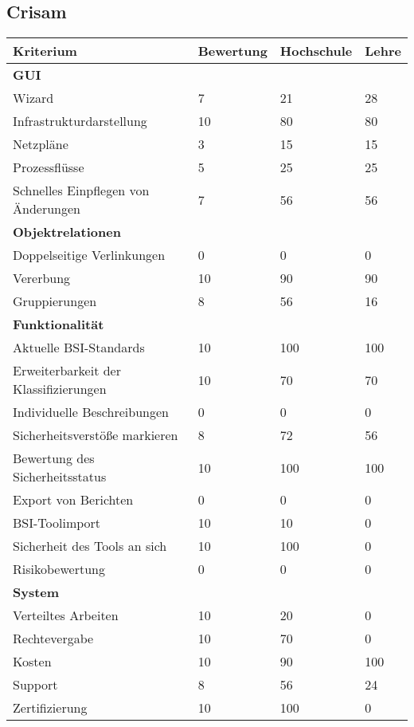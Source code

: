 \documentclass{book}
\begin{document}
\subsection{Crisam}
\begin{table}[h]
\begin{tabular}{|p{}|p{}|p{}|p{}|}
\hline 
Kriterium & Bewertung & Hochschule & Lehre\\ 
\hline 
\textbf{GUI}& & &\\
\hline
Wizard & 7 & 21 & 28\\
\hline 
Infrastrukturdarstellung & 10 & 80 & 80 \\
\hline 
Netzpläne & 3 & 15 & 15\\
\hline 
Prozessflüsse & 5 & 25 & 25\\
\hline 
Schnelles Einpflegen von Änderungen & 7 & 56 & 56\\
\hline
\textbf{Objektrelationen} & & & \\
\hline 
Doppelseitige Verlinkungen & 0 & 0 & 0 \\
\hline 
Vererbung & 10 & 90 & 90\\
\hline 
Gruppierungen & 8 & 56 & 16 \\
\hline 
\textbf{Funktionalität} & & &\\
\hline 
Aktuelle BSI-Standards & 10 & 100 & 100 \\
\hline  
Erweiterbarkeit der Klassifizierungen & 10 & 70 & 70\\
\hline 
Individuelle Beschreibungen & 0 & 0 & 0\\
\hline 
Sicherheitsverstöße markieren & 8 & 72 & 56 \\
\hline
Bewertung des Sicherheitsstatus & 10 & 100 & 100 \\
\hline
Export von Berichten & 0 & 0 & 0 \\
\hline
BSI-Toolimport & 10 & 10 & 0\\
\hline
Sicherheit des Tools an sich & 10 & 100 & 0\\
\hline
Risikobewertung & 0 & 0 & 0\\
\hline
\textbf{System}& & &\\
\hline
Verteiltes Arbeiten & 10 & 20 & 0 \\
\hline
Rechtevergabe & 10 & 70 & 0 \\
\hline
Kosten & 10 & 90 & 100\\
\hline
Support & 8 & 56 & 24 \\
\hline
Zertifizierung & 10 & 100 & 0\\

\end{tabular}
\end{table}
\end{document}
